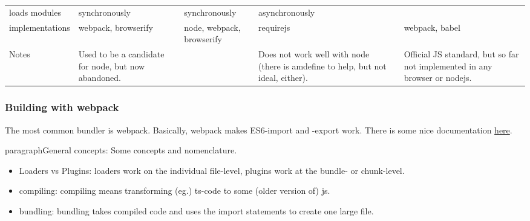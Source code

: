 \begin{table}[H]
\begin{tabularx}{1.0\textwidth}{XXXXXX}
        loads modules   & synchronously                                                                              & synchronously                                                                               & asynchronously                                                                   &                                                          &                                                           \\
        implementations & webpack, browserify                                                                        & node, webpack, browserify                                                                   & requirejs                                                                        &                                                          & webpack, babel                                            \\
        Notes           & Used to be a candidate for node, but now abandoned.                                        &                                                                                             & Does not work well with node (there is amdefine to help, but not ideal, either). &                                                          & Official JS standard, but so far not implemented in any browser or nodejs.
    \end{tabularx}
\end{table}





\subsubsection{Building with webpack}
The most common bundler is webpack. Basically, webpack makes ES6-import and -export work. There is some nice documentation \href{https://what-problem-does-it-solve.com/webpack/index.html}{here}.

paragraph{General concepts}: Some concepts and nomenclature.

\begin{itemize}
    \item Loaders vs Plugins: loaders work on the individual file-level, plugins work at the bundle- or chunk-level.
    \item compiling: compiling means transforming (eg.) ts-code to some (older version of) js.
    \item bundling: bundling takes compiled code and uses the import statements to create one large file.
\end{itemize}

